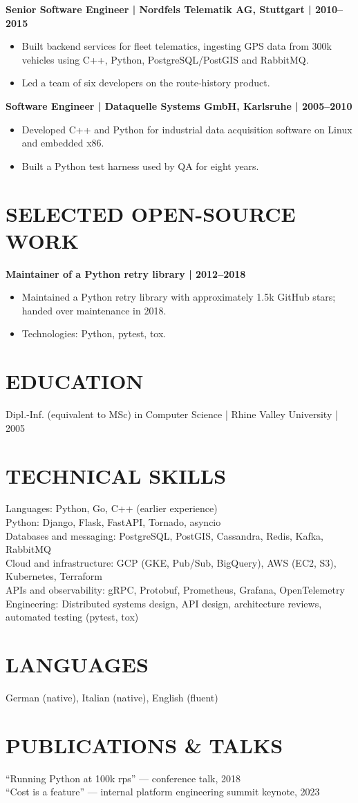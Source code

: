 \documentclass[11pt,a4paper]{article}
\begin{document}
\textbf{Senior Software Engineer | Nordfels Telematik AG, Stuttgart | 2010–2015}
\begin{itemize}
\item Built backend services for fleet telematics, ingesting GPS data from 300k vehicles using C++, Python, PostgreSQL/PostGIS and RabbitMQ.
\item Led a team of six developers on the route-history product.
\end{itemize}

\textbf{Software Engineer | Dataquelle Systems GmbH, Karlsruhe | 2005–2010}
\begin{itemize}
\item Developed C++ and Python for industrial data acquisition software on Linux and embedded x86.
\item Built a Python test harness used by QA for eight years.
\end{itemize}

\section*{SELECTED OPEN-SOURCE WORK}
\textbf{Maintainer of a Python retry library | 2012–2018}
\begin{itemize}
\item Maintained a Python retry library with approximately 1.5k GitHub stars; handed over maintenance in 2018.
\item Technologies: Python, pytest, tox.
\end{itemize}

\section*{EDUCATION}
Dipl.-Inf. (equivalent to MSc) in Computer Science | Rhine Valley University | 2005

\section*{TECHNICAL SKILLS}
Languages: Python, Go, C++ (earlier experience)\\
Python: Django, Flask, FastAPI, Tornado, asyncio\\
Databases and messaging: PostgreSQL, PostGIS, Cassandra, Redis, Kafka, RabbitMQ\\
Cloud and infrastructure: GCP (GKE, Pub/Sub, BigQuery), AWS (EC2, S3), Kubernetes, Terraform\\
APIs and observability: gRPC, Protobuf, Prometheus, Grafana, OpenTelemetry\\
Engineering: Distributed systems design, API design, architecture reviews, automated testing (pytest, tox)

\section*{LANGUAGES}
German (native), Italian (native), English (fluent)

\section*{PUBLICATIONS \& TALKS}
“Running Python at 100k rps” — conference talk, 2018\\
“Cost is a feature” — internal platform engineering summit keynote, 2023
\end{document}
